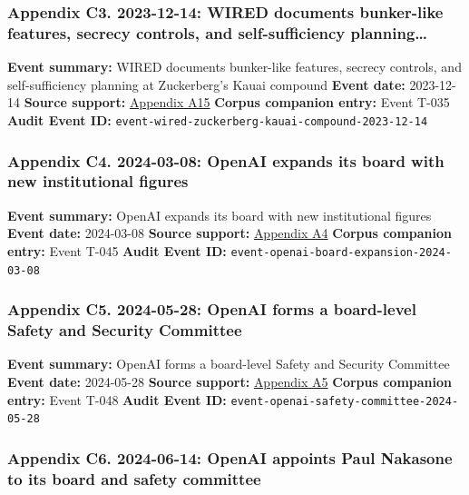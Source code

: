 \documentclass[
  american,
  11pt,
  letterpaper,
]{article}
\begin{document}
\subsubsection{Appendix C3. 2023-12-14: WIRED documents bunker-like
features, secrecy controls, and self-sufficiency
planning\ldots{}}\label{ch-08-appendix-c3-2023-12-14-wired-documents-bunker-like-features-secrecy-controls-and-self-sufficiency-planning-at-zuckerberg-s-kauai-compound}

\textbf{Event summary:} WIRED documents bunker-like features, secrecy
controls, and self-sufficiency planning at Zuckerberg's Kauai compound
\textbf{Event date:} 2023-12-14 \textbf{Source support:}
\hyperref[ch-08-appendix-a15-inside-mark-zuckerbergs-top-secret-hawaii-compound]{Appendix
A15} \textbf{Corpus companion entry:} Event T-035 \textbf{Audit Event
ID:} \texttt{event-wired-zuckerberg-kauai-compound-2023-12-14}

\subsubsection{Appendix C4. 2024-03-08: OpenAI expands its board with
new institutional
figures}\label{ch-08-appendix-c4-2024-03-08-openai-expands-its-board-with-new-institutional-figures}

\textbf{Event summary:} OpenAI expands its board with new institutional
figures \textbf{Event date:} 2024-03-08 \textbf{Source support:}
\hyperref[ch-08-appendix-a4-openai-announces-new-members-to-board-of-directors]{Appendix
A4} \textbf{Corpus companion entry:} Event T-045 \textbf{Audit Event
ID:} \texttt{event-openai-board-expansion-2024-03-08}

\subsubsection{Appendix C5. 2024-05-28: OpenAI forms a board-level
Safety and Security
Committee}\label{ch-08-appendix-c5-2024-05-28-openai-forms-a-board-level-safety-and-security-committee}

\textbf{Event summary:} OpenAI forms a board-level Safety and Security
Committee \textbf{Event date:} 2024-05-28 \textbf{Source support:}
\hyperref[ch-08-appendix-a5-openai-board-forms-safety-and-security-committee]{Appendix
A5} \textbf{Corpus companion entry:} Event T-048 \textbf{Audit Event
ID:} \texttt{event-openai-safety-committee-2024-05-28}

\subsubsection{Appendix C6. 2024-06-14: OpenAI appoints Paul Nakasone to
its board and safety
committee}\label{ch-08-appendix-c6-2024-06-14-openai-appoints-paul-nakasone-to-its-board-and-safety-committee}
\end{document}
